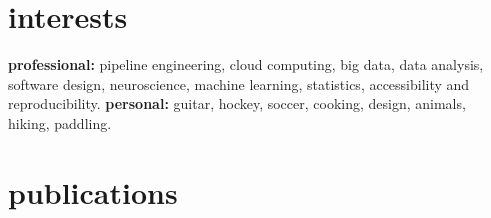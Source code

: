 \documentclass[]{friggeri-cv} %
\begin{document}

\vspace{9pt}
\section{interests}

\textbf{professional:} pipeline engineering, cloud computing, big data, data analysis,
software design, neuroscience, machine learning, statistics, accessibility and reproducibility.
\textbf{personal:} guitar, hockey, soccer, cooking, design, animals, hiking, paddling.


\section{publications}






\end{document}
